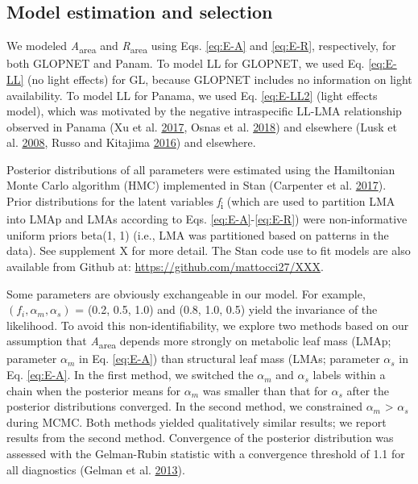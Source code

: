 \documentclass[
  12pt,
]{article}
\begin{document}
\hypertarget{model-estimation-and-selection}{%
\subsection{Model estimation and selection}\label{model-estimation-and-selection}}

We modeled \emph{A}\textsubscript{area} and \emph{R}\textsubscript{area} using Eqs. \eqref{eq:E-A} and \eqref{eq:E-R}, respectively, for both GLOPNET and Panam.
To model LL for GLOPNET, we used Eq. \eqref{eq:E-LL} (no light effects) for GL, because GLOPNET includes no information on light availability.
To model LL for Panama, we used Eq. \eqref{eq:E-LL2} (light effects model), which was motivated by the negative intraspecific LL-LMA relationship observed in Panama (Xu et al. \protect\hyperlink{ref-Xu2017}{2017}, Osnas et al. \protect\hyperlink{ref-Osnas2018}{2018}) and elsewhere (Lusk et al. \protect\hyperlink{ref-Lusk2008}{2008}, Russo and Kitajima \protect\hyperlink{ref-Russo2016}{2016}) and elsewhere.

Posterior distributions of all parameters were estimated using the Hamiltonian Monte Carlo algorithm (HMC) implemented in Stan (Carpenter et al. \protect\hyperlink{ref-Carpenter2017}{2017}).
Prior distributions for the latent variables \emph{f}\textsubscript{i} (which are used to partition LMA into LMAp and LMAs according to Eqs. \eqref{eq:E-A}-\eqref{eq:E-R}) were non-informative uniform priors beta(1, 1) (i.e., LMA was partitioned based on patterns in the data). See supplement X for more detail.
The Stan code use to fit models are also available from Github at: \href{https://github.com/mattocci27/LMApLMAs}{https://github.com/mattocci27/XXX}.

Some parameters are obviously exchangeable in our model.
For example, \((f_i, \alpha_m, \alpha_s)\) = (0.2, 0.5, 1.0) and (0.8, 1.0, 0.5) yield the invariance of the likelihood.
To avoid this non-identifiability, we explore two methods based on our assumption that \emph{A}\textsubscript{area} depends more strongly on metabolic leaf mass (LMAp; parameter \(\alpha_m\) in Eq. \eqref{eq:E-A}) than structural leaf mass (LMAs; parameter \(\alpha_s\) in Eq. \eqref{eq:E-A}.
In the first method, we switched the \(\alpha_m\) and \(\alpha_s\) labels within a chain when the posterior means for \(\alpha_m\) was smaller than that for \(\alpha_s\) after the posterior distributions converged.
In the second method, we constrained \(\alpha_m\) \textgreater{} \(\alpha_s\) during MCMC.
Both methods yielded qualitatively similar results; we report results from the second method.
Convergence of the posterior distribution was assessed with the Gelman-Rubin statistic with a convergence threshold of 1.1 for all diagnostics (Gelman et al. \protect\hyperlink{ref-Gelman2013}{2013}).
\end{document}
